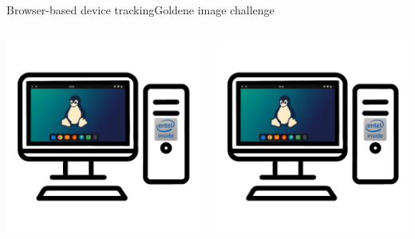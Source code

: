 \documentclass[aspectratio=169, hyperref={colorlinks=true, allcolors=SecondaryColor}, c]{beamer}
\begin{document}
\begin{frame}[fragile]{Browser-based device tracking}{Goldene image challenge}
\begin{columns}
\begin{column}{0.33\textwidth}
				\includegraphics[width=1\textwidth]{./figures/computer_alpha_screen_2_golden.png}
			\end{column}
			\begin{column}{0.33\textwidth}
				\includegraphics[width=1\textwidth]{./figures/computer_alpha_screen_2_golden.png}

\end{column}
\end{columns}
\end{frame}
\end{document}
